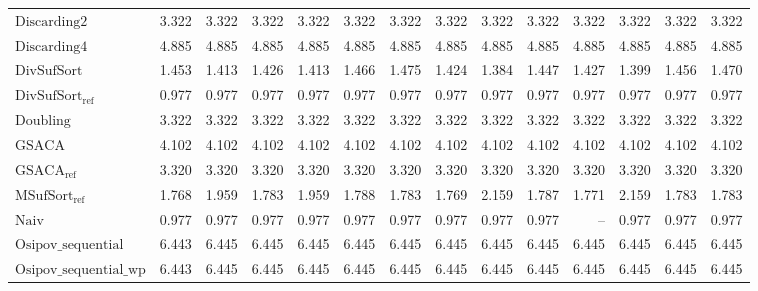 \begin{table}[h]
{\begin{tabular}{lrrrrrrrrrrrrr}
    $\text{Discarding2}$ & 3.322 & 3.322 & 3.322 & 3.322 & 3.322 & 3.322 & 3.322 & 3.322 & 3.322 & 3.322 & 3.322 & 3.322 & 3.322 \\
    $\text{Discarding4}$ & 4.885 & 4.885 & 4.885 & 4.885 & 4.885 & 4.885 & 4.885 & 4.885 & 4.885 & 4.885 & 4.885 & 4.885 & 4.885 \\
    $\text{DivSufSort}$ & 1.453 & 1.413 & 1.426 & 1.413 & 1.466 & 1.475 & 1.424 & 1.384 & 1.447 & 1.427 & 1.399 & 1.456 & 1.470 \\
    $\text{DivSufSort}_{\text{ref}}$ & {\color{green!60!black}0.977} & 0.977 & 0.977 & 0.977 & {\color{green!60!black}0.977} & {\color{green!60!black}0.977} & {\color{green!60!black}0.977} & {\color{green!60!black}0.977} & {\color{green!60!black}0.977} & {\color{green!60!black}0.977} & {\color{green!60!black}0.977} & {\color{green!60!black}0.977} & {\color{green!60!black}0.977} \\
    $\text{Doubling}$ & 3.322 & 3.322 & 3.322 & 3.322 & 3.322 & 3.322 & 3.322 & 3.322 & 3.322 & 3.322 & 3.322 & 3.322 & 3.322 \\
    $\text{GSACA}$ & 4.102 & 4.102 & 4.102 & 4.102 & 4.102 & 4.102 & 4.102 & 4.102 & 4.102 & 4.102 & 4.102 & 4.102 & 4.102 \\
    $\text{GSACA}_{\text{ref}}$ & 3.320 & 3.320 & 3.320 & 3.320 & 3.320 & 3.320 & 3.320 & 3.320 & 3.320 & 3.320 & 3.320 & 3.320 & 3.320 \\
    $\text{MSufSort}_{\text{ref}}$ & 1.768 & 1.959 & 1.783 & 1.959 & 1.788 & 1.783 & 1.769 & 2.159 & 1.787 & 1.771 & 2.159 & 1.783 & 1.783 \\
    $\text{Naiv}$ & {\color{green!60!black}0.977} & {\color{green!60!black}0.977} & {\color{green!60!black}0.977} & {\color{green!60!black}0.977} & {\color{green!60!black}0.977} & {\color{green!60!black}0.977} & {\color{green!60!black}0.977} & {\color{green!60!black}0.977} & {\color{green!60!black}0.977} & {\color{darkgray}--} & {\color{green!60!black}0.977} & {\color{green!60!black}0.977} & {\color{green!60!black}0.977} \\
    $\text{Osipov\_sequential}$ & {\color{red}6.443} & {\color{red}6.445} & {\color{red}6.445} & {\color{red}6.445} & {\color{red}6.445} & {\color{red}6.445} & {\color{red}6.445} & {\color{red}6.445} & {\color{red}6.445} & {\color{red}6.445} & {\color{red}6.445} & {\color{red}6.445} & {\color{red}6.445} \\
    $\text{Osipov\_sequential\_wp}$ & {\color{red}6.443} & {\color{red}6.445} & {\color{red}6.445} & {\color{red}6.445} & {\color{red}6.445} & {\color{red}6.445} & {\color{red}6.445} & {\color{red}6.445} & {\color{red}6.445} & {\color{red}6.445} & {\color{red}6.445} & {\color{red}6.445} & {\color{red}6.445} \\

\end{tabular}}
\end{table}
